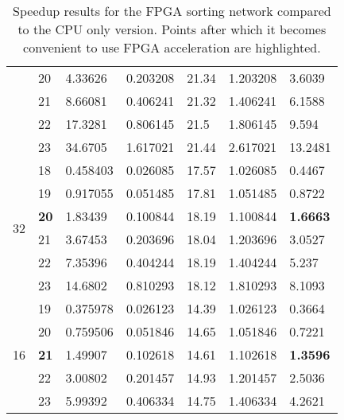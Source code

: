 \begin{table}
\begin{tabularx}{\textwidth}{X|X|X|X|X|X|X}
    & 20          & 4.33626  & 0.203208  & 21.34           & 1.203208        & 3.6039             \\
    & 21          & 8.66081  & 0.406241  & 21.32           & 1.406241        & 6.1588             \\
    & 22          & 17.3281  & 0.806145  & 21.5            & 1.806145        & 9.594              \\
    & 23          & 34.6705  & 1.617021  & 21.44           & 2.617021        & 13.2481            \\
    \hline
    \multirow{6}{*}{32}     & 18          & 0.458403 & 0.026085  & 17.57           & 1.026085        & 0.4467             \\
    & 19          & 0.917055 & 0.051485  & 17.81           & 1.051485        & 0.8722             \\
    & \textbf{20} & 1.83439  & 0.100844  & 18.19           & 1.100844        & \textbf{1.6663}    \\
    & 21          & 3.67453  & 0.203696  & 18.04           & 1.203696        & 3.0527             \\
    & 22          & 7.35396  & 0.404244  & 18.19           & 1.404244        & 5.237              \\
    & 23          & 14.6802  & 0.810293  & 18.12           & 1.810293        & 8.1093             \\
    \hline
    \multirow{5}{*}{16}  & 19          & 0.375978 & 0.026123  & 14.39           & 1.026123        & 0.3664             \\
    & 20          & 0.759506 & 0.051846  & 14.65           & 1.051846        & 0.7221             \\
    & \textbf{21} & 1.49907  & 0.102618  & 14.61           & 1.102618        & \textbf{1.3596}    \\
    & 22          & 3.00802  & 0.201457  & 14.93           & 1.201457        & 2.5036             \\    & 23          & 5.99392  & 0.406334  & 14.75           & 1.406334        & 4.2621             \\
  \end{tabularx}
  \caption{Speedup results for the FPGA sorting network compared to
    the CPU only version. Points after which it becomes convenient to
    use FPGA acceleration are highlighted.}
  \label{table:bit-data}
\end{table}